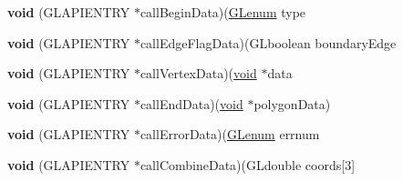 \begin{DoxyCompactItemize}
\item 
\mbox{\label{struct_g_l_utesselator_ae4fc559791848d378425ecc0d2b6665d}} 
{\bfseries void} (G\+L\+A\+P\+I\+E\+N\+T\+RY $\ast$call\+Begin\+Data)(\hyperlink{interfacevoid}{G\+Lenum} type
\item 
\mbox{\label{struct_g_l_utesselator_a2a32f1ae4821d01899601992c81303e8}} 
{\bfseries void} (G\+L\+A\+P\+I\+E\+N\+T\+RY $\ast$call\+Edge\+Flag\+Data)(G\+Lboolean boundary\+Edge
\item 
\mbox{\label{struct_g_l_utesselator_a28927fd721bdce7037d554cfc9224e3a}} 
{\bfseries void} (G\+L\+A\+P\+I\+E\+N\+T\+RY $\ast$call\+Vertex\+Data)(\hyperlink{interfacevoid}{void} $\ast$data
\item 
\mbox{\label{struct_g_l_utesselator_a821f015487421cb12b3a490f16ebb5c6}} 
{\bfseries void} (G\+L\+A\+P\+I\+E\+N\+T\+RY $\ast$call\+End\+Data)(\hyperlink{interfacevoid}{void} $\ast$polygon\+Data)
\item 
\mbox{\label{struct_g_l_utesselator_a39d4634744cf55554c02a44ae01a629a}} 
{\bfseries void} (G\+L\+A\+P\+I\+E\+N\+T\+RY $\ast$call\+Error\+Data)(\hyperlink{interfacevoid}{G\+Lenum} errnum
\item 
\mbox{\label{struct_g_l_utesselator_ac01a96b1b3151d4981a3577fd2d6678c}} 
{\bfseries void} (G\+L\+A\+P\+I\+E\+N\+T\+RY $\ast$call\+Combine\+Data)(G\+Ldouble coords\mbox{[}3\mbox{]}
\end{DoxyCompactItemize}
